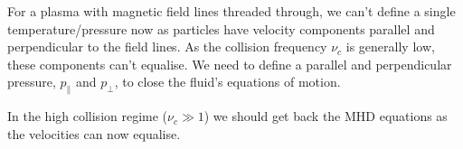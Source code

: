 \documentclass[12pt,letterpaper]{article}
\begin{document}
  For a plasma with magnetic field lines threaded through, we can't define a single temperature/pressure now as particles have velocity components parallel and perpendicular to the field lines. As the collision frequency $\nu_c$ is generally low, these components can't equalise. We need to define a parallel and perpendicular pressure, $p_\|$ and $p_\perp$, to close the fluid's equations of motion.

  In the high collision regime ($\nu_c \gg 1$) we should get back the MHD equations as the velocities can now equalise.
\end{document}
